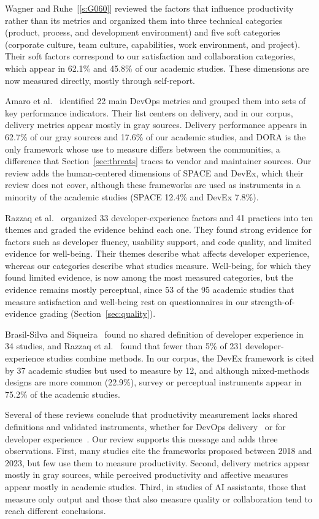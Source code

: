 \documentclass[preprint,number]{elsarticle}
\newcommand{\refG}[1]{\ref{s:#1}}
\begin{document}
Wagner and Ruhe~[\refG{G060}] reviewed the factors that influence productivity rather than its metrics and organized them into three technical categories (product, process, and development environment) and five soft categories (corporate culture, team culture, capabilities, work environment, and project). Their soft factors correspond to our satisfaction and collaboration categories, which appear in 62.1\% and 45.8\% of our academic studies. These dimensions are now measured directly, mostly through self-report.

Amaro et al.~\cite{amaro2024devops} identified 22 main DevOps metrics and grouped them into sets of key performance indicators. Their list centers on delivery, and in our corpus, delivery metrics appear mostly in gray sources. Delivery performance appears in 62.7\% of our gray sources and 17.6\% of our academic studies, and DORA is the only framework whose use to measure differs between the communities, a difference that Section~\ref{sec:threats} traces to vendor and maintainer sources. Our review adds the human-centered dimensions of SPACE and DevEx, which their review does not cover, although these frameworks are used as instruments in a minority of the academic studies (SPACE 12.4\% and DevEx 7.8\%).

Razzaq et al.~\cite{P0604} organized 33 developer-experience factors and 41 practices into ten themes and graded the evidence behind each one. They found strong evidence for factors such as developer fluency, usability support, and code quality, and limited evidence for well-being. Their themes describe what affects developer experience, whereas our categories describe what studies measure. Well-being, for which they found limited evidence, is now among the most measured categories, but the evidence remains mostly perceptual, since 53 of the 95 academic studies that measure satisfaction and well-being rest on questionnaires in our strength-of-evidence grading (Section~\ref{sec:quality}).

Brasil-Silva and Siqueira~\cite{P0476} found no shared definition of developer experience in 34 studies, and Razzaq et al.~\cite{P0593} found that fewer than 5\% of 231 developer-experience studies combine methods. In our corpus, the DevEx framework is cited by 37 academic studies but used to measure by 12, and although mixed-methods designs are more common (22.9\%), survey or perceptual instruments appear in 75.2\% of the academic studies.

Several of these reviews conclude that productivity measurement lacks shared definitions and validated instruments, whether for DevOps delivery~\cite{leite2019devops} or for developer experience~\cite{P0476, P0593}. Our review supports this message and adds three observations. First, many studies cite the frameworks proposed between 2018 and 2023, but few use them to measure productivity. Second, delivery metrics appear mostly in gray sources, while perceived productivity and affective measures appear mostly in academic studies. Third, in studies of AI assistants, those that measure only output and those that also measure quality or collaboration tend to reach different conclusions.
\end{document}
